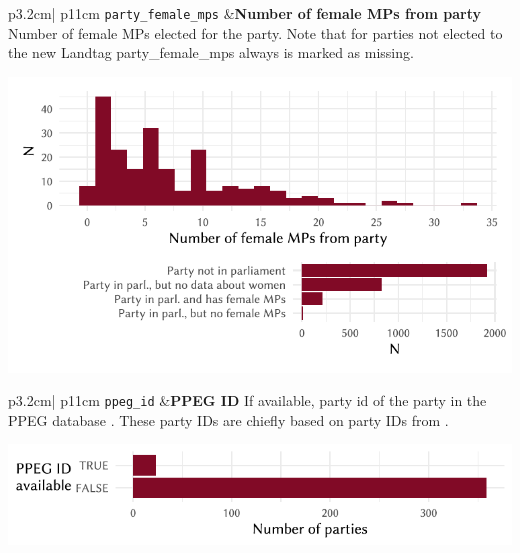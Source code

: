 \documentclass[
]{scrartcl}
\begin{document}
\begin{longtable}{p{3.2cm}| p{11cm}}
\texttt{party\_female\_mps} &\textbf{Number of female MPs from party}\newline 
Number of female MPs elected for the party. Note that for parties not elected to the new Landtag party\_female\_mps always is marked as missing.

\hspace*{.25cm}
\begin{minipage}[t]{\linewidth }
\vspace{0pt}
\includegraphics[width = \linewidth]{cbfiles/pfmpcplot.pdf}
\end{minipage}


\end{longtable}

\begin{longtable}{p{3.2cm}| p{11cm}}
\texttt{ppeg\_id} &\textbf{PPEG ID}\newline 
If available, party id of the party in the PPEG database \parencite{ppegDatabasePoliticalParties2022}. These party IDs are chiefly based on party IDs from \textcite{mackieInternationalAlmanacElectoral1991}.


\hspace*{.25cm}
\begin{minipage}[t]{\linewidth }
\vspace{0pt}
\includegraphics[width = \linewidth]{cbfiles/govelecplot.pdf}
\end{minipage}


\end{longtable}
\end{document}
